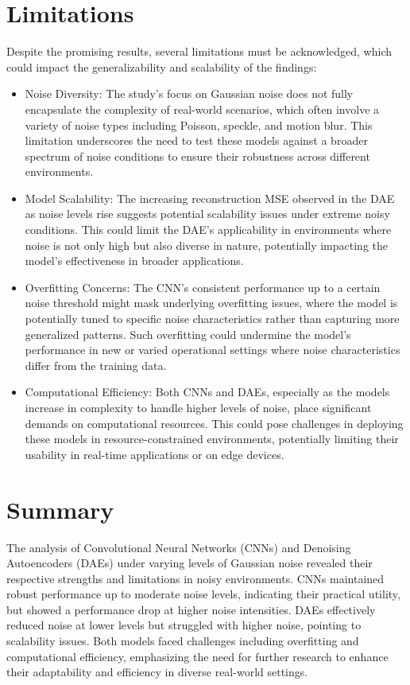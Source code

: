 \section{Limitations} 
Despite the promising results, several limitations must be acknowledged, which could impact the generalizability and scalability of the findings:


\begin{itemize}
    \item Noise Diversity: The study's focus on Gaussian noise does not fully encapsulate the complexity of real-world scenarios, which often involve a variety of noise types including Poisson, speckle, and motion blur. This limitation underscores the need to test these models against a broader spectrum of noise conditions to ensure their robustness across different environments.

    \item Model Scalability: The increasing reconstruction MSE observed in the DAE as noise levels rise suggests potential scalability issues under extreme noisy conditions. This could limit the DAE's applicability in environments where noise is not only high but also diverse in nature, potentially impacting the model’s effectiveness in broader applications.

    \item Overfitting Concerns: The CNN's consistent performance up to a certain noise threshold might mask underlying overfitting issues, where the model is potentially tuned to specific noise characteristics rather than capturing more generalized patterns. Such overfitting could undermine the model’s performance in new or varied operational settings where noise characteristics differ from the training data.

    \item Computational Efficiency: Both CNNs and DAEs, especially as the models increase in complexity to handle higher levels of noise, place significant demands on computational resources. This could pose challenges in deploying these models in resource-constrained environments, potentially limiting their usability in real-time applications or on edge devices.

\end{itemize}


\section{Summary}
The analysis of Convolutional Neural Networks (CNNs) and Denoising Autoencoders (DAEs) under varying levels of Gaussian noise revealed their respective strengths and limitations in noisy environments. CNNs maintained robust performance up to moderate noise levels, indicating their practical utility, but showed a performance drop at higher noise intensities. DAEs effectively reduced noise at lower levels but struggled with higher noise, pointing to scalability issues. Both models faced challenges including overfitting and computational efficiency, emphasizing the need for further research to enhance their adaptability and efficiency in diverse real-world settings.